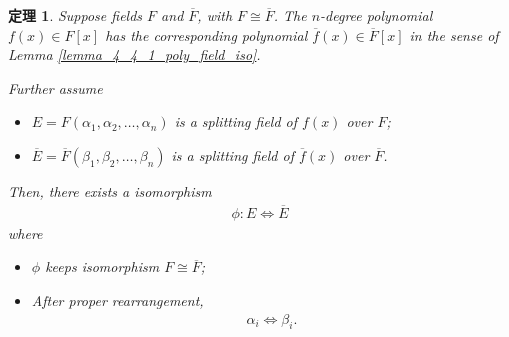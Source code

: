 \documentclass[utf8]{ctexbook}
\newtheorem{theorem}{定理}[section]
\begin{document}
\begin{theorem}
\label{theorem_4_4_3_uniqueness_splitting_field}
Suppose fields $F$ and $\overline{F}$, with $F \cong \overline{F}$. The $n$-degree polynomial $f(x) \in F[x]$ has the corresponding polynomial $\overline{f}(x) \in \overline{F}[x]$ in the sense of Lemma \ref{lemma_4_4_1_poly_field_iso}.

Further assume
\begin{itemize}
\item{$E= F(\alpha_1, \alpha_2, \ldots, \alpha_n)$ is a splitting field of $f(x)$ over $F$;}
\item{$\overline{E}= \overline{F} ( \beta_1, \beta_2, \ldots, \beta_n)$ is a splitting field of $\overline{f} (x)$ over $ \overline{F}$.}
\end{itemize}

Then, there exists a isomorphism
\begin{align*}
\phi : E \iff \overline{E}
\end{align*}
where
\begin{itemize}
\item{$\phi$ keeps isomorphism $F \cong \overline{F}$; }
\item{After proper rearrangement, 
\begin{align*}
\alpha_i \iff \beta_i .
\end{align*}
}
\end{itemize}

\end{theorem}
\end{document}

